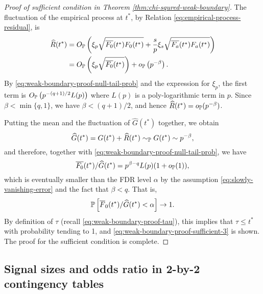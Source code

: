 \begin{proof}[Proof of sufficient condition in Theorem \ref{thm:chi-squred-weak-boundary}]
The fluctuation of the empirical process at $t^*$, by Relation \eqref{eq:empirical-process-residual}, is 
\begin{align*}
    \widehat{R}(t^*) 
    &= O_\P\left(\xi_p\sqrt{\overline{F_0}(t^*)F_0(t^*)} + \frac{s}{p}\xi_s\sqrt{\overline{F_a}(t^*)F_a(t^*)}\right)\\
    &= O_\P\left(\xi_p\sqrt{\overline{F_0}(t^*)}\right) + o_\P\left(p^{-\beta}\right).
\end{align*}
By \eqref{eq:weak-boundary-proof-null-tail-prob} and the expression for $\xi_p$, the first term is $O_\P\left(p^{-(q+1)/2}L(p)\right)$ where $L(p)$ is a poly-logarithmic term in $p$.
Since $\beta<\min\{q,1\}$, we have $\beta<(q+1)/2$, and hence $\widehat{R}(t^*) = o_\P(p^{-\beta})$.

Putting the mean and the fluctuation of $\widehat{G}(t^*)$ together, we obtain
$$
\widehat{G}(t^*) = G(t^*) + \widehat{R}(t^*) \sim_\P G(t^*) \sim p^{-\beta},
$$
and therefore, together with \eqref{eq:weak-boundary-proof-null-tail-prob}, we have
$$
\overline{F_0}(t^*)/\widehat{G}(t^*) = p^{\beta-q}L(p)(1+o_{\P}(1)),
$$
which is eventually smaller than the FDR level $\alpha$ by the assumption \eqref{eq:slowly-vanishing-error} and the fact that $\beta<q$.
That is, 
$$
\P\left[\overline{F}_0(t^*) / \widehat{G}(t^*) < \alpha\right] \to 1.
$$
By definition of $\tau$ (recall \eqref{eq:weak-boundary-proof-tau}), this implies that $\tau \le t^*$ with probability tending to 1, and \eqref{eq:weak-boundary-proof-sufficient-3} is shown.
The proof for the sufficient condition is complete.
\end{proof}

\subsection{Signal sizes and odds ratio in 2-by-2 contingency tables}
\label{subsec:proof-signal-size-odds-ratio}

